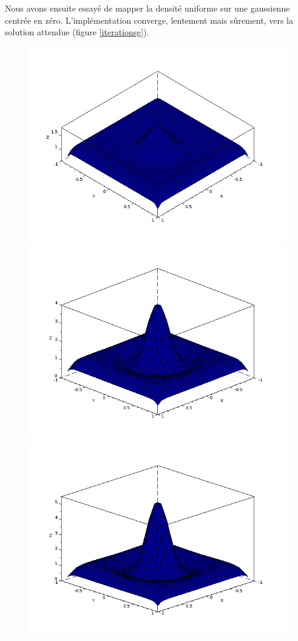 \documentclass[12pt,a4paper,twoside]{article}
\begin{document}
Nous avons ensuite essayé de mapper la densité uniforme sur une gaussienne centrée en zéro. L'implémentation converge,
lentement mais sûrement, vers la solution attendue (figure \ref{iterationsg}).


\begin{figure}
\begin{center}
\includegraphics[scale=0.35]{Images/itergaussienne0.png}
\includegraphics[scale=0.35]{Images/itergaussienne1.png}
\includegraphics[scale=0.35]{Images/itergaussienne2.png}

\end{center}
\end{figure}
\end{document}
